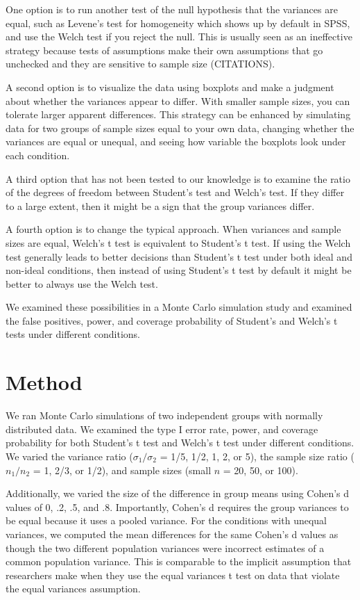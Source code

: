 \documentclass[man,a4paper,noextraspace]{apa6}\usepackage[]{graphicx}\usepackage[]{color}
\begin{document}
    One option is to run another test of the null hypothesis that the variances are equal, such as Levene's test for homogeneity which shows up by default in SPSS, and use the Welch test if you reject the null. This is usually seen as an ineffective strategy because tests of assumptions make their own assumptions that go unchecked and they are sensitive to sample size (CITATIONS). 

    A second option is to visualize the data using boxplots and make a judgment about whether the variances appear to differ. With smaller sample sizes, you can tolerate larger apparent differences. This strategy can be enhanced by simulating data for two groups of sample sizes equal to your own data, changing whether the variances are equal or unequal, and seeing how variable the boxplots look under each condition. 

    A third option that has not been tested to our knowledge is to examine the ratio of the degrees of freedom between Student's test and Welch's test. If they differ to a large extent, then it might be a sign that the group variances differ.

    A fourth option is to change the typical approach. When variances and sample sizes are equal, Welch's t test is equivalent to Student's t test. If using the Welch test generally leads to better decisions than Student's t test under both ideal and non-ideal conditions, then instead of using Student's t test by default it might be better to always use the Welch test.
    
    We examined these possibilities in a Monte Carlo simulation study and examined the false positives, power, and coverage probability of Student's and Welch's t tests under different conditions. 

\section{Method}
    We ran Monte Carlo simulations of two independent groups with normally distributed data. We examined the type I error rate, power, and coverage probability for both Student's t test and Welch's t test under different conditions. We varied the variance ratio ($\sigma_{1}/\sigma_{2}$ = 1/5, 1/2, 1, 2, or 5), the sample size ratio ($n_{1}/n_{2}$ = 1, 2/3, or 1/2), and sample sizes (small $n$ = 20, 50, or 100). 
    
    Additionally, we varied the size of the difference in group means using Cohen's d values of 0, .2, .5, and .8. Importantly, Cohen's d requires the group variances to be equal because it uses a pooled variance. For the conditions with unequal variances, we computed the mean differences for the same Cohen's d values as though the two different population variances were incorrect estimates of a common population variance. This is comparable to the implicit assumption that researchers make when they use the equal variances t test on data that violate the equal variances assumption.
    
\end{document}
